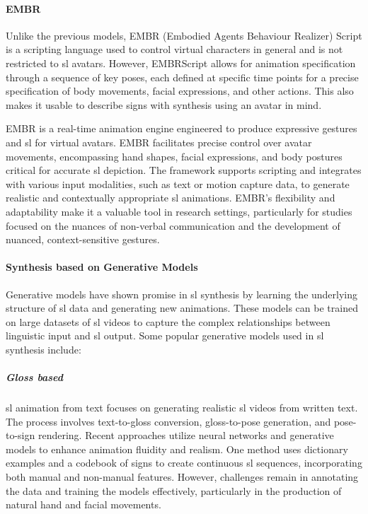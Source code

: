 \documentclass[../../main.tex]{subfiles}
\begin{document}
\paragraph{EMBR}
\label{ch:background_work:sign_language_synthesis:3d_techniques:sign_language_synthesis_systems:embr}

Unlike the previous models, EMBR (Embodied Agents Behaviour Realizer) Script is a scripting language used to control virtual characters in general and is not restricted to \gls{sl} avatars. However, EMBRScript allows for animation specification through a sequence of key poses, each defined at specific time points for a precise specification of body movements, facial expressions, and other actions. This also makes it usable to describe signs with synthesis using an avatar in mind.

EMBR is a real-time animation engine engineered to produce expressive gestures and \gls{sl} for virtual avatars. EMBR facilitates precise control over avatar movements, encompassing hand shapes, facial expressions, and body postures critical for accurate \gls{sl} depiction. The framework supports scripting and integrates with various input modalities, such as text or motion capture data, to generate realistic and contextually appropriate \gls{sl} animations. EMBR's flexibility and adaptability make it a valuable tool in research settings, particularly for studies focused on the nuances of non-verbal communication and the development of nuanced, context-sensitive gestures.

\paragraph{Synthesis based on Generative Models}
\label{ch:background_work:sign_language_synthesis:3d_techniques:sign_language_synthesis_systems:synthesis_based_on_generative_models}

Generative models have shown promise in \gls{sl} synthesis by learning the underlying structure of \gls{sl} data and generating new animations. These models can be trained on large datasets of \gls{sl} videos to capture the complex relationships between linguistic input and \gls{sl} output. Some popular generative models used in \gls{sl} synthesis include:

\subparagraph{Gloss based}
\label{ch:background_work:sign_language_synthesis:3d_techniques:sign_language_synthesis_systems:synthesis_based_on_generative_models:gloss_based}

\gls{sl} animation from text focuses on generating realistic \gls{sl} videos from written text. The process involves text-to-gloss conversion, gloss-to-pose generation, and pose-to-sign rendering. Recent approaches utilize neural networks and generative models to enhance animation fluidity and realism. One method uses dictionary examples and a codebook of signs to create continuous \gls{sl} sequences, incorporating both manual and non-manual features. However, challenges remain in annotating the data and training the models effectively, particularly in the production of natural hand and facial movements.
\end{document}
